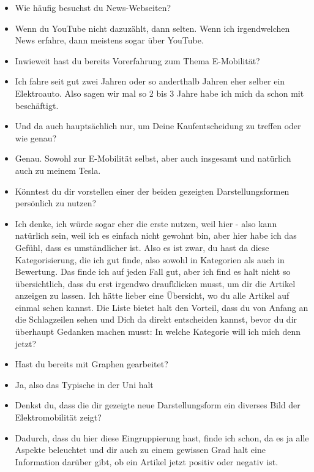{\begin{itemize}[]
                  Und dann halt typische Internetforen.
            \item {} Wie häufig besuchst du News-Webseiten?
            \item {} Wenn du YouTube nicht dazuzählt, dann selten.
                  Wenn ich irgendwelchen News erfahre, dann meistens sogar über YouTube.
            \item {} Inwieweit hast du bereits Vorerfahrung zum Thema E-Mobilität?
            \item {} Ich fahre seit gut zwei Jahren oder so anderthalb Jahren eher selber ein Elektroauto.
                  Also sagen wir mal so 2 bis 3 Jahre habe ich mich da schon mit beschäftigt.
            \item {} Und da auch hauptsächlich nur, um Deine Kaufentscheidung zu treffen oder wie genau?
            \item {} Genau.
                  Sowohl zur E-Mobilität selbst, aber auch insgesamt und natürlich auch zu meinem Tesla.
            \item {} Könntest du dir vorstellen einer der beiden gezeigten Darstellungsformen persönlich zu nutzen?
            \item {} Ich denke, ich würde sogar eher die erste nutzen, weil hier - also kann natürlich sein, weil ich es einfach nicht gewohnt bin, aber hier habe ich das Gefühl, dass es umständlicher ist.
                  Also es ist zwar, du hast da diese Kategorisierung, die ich gut finde, also sowohl in Kategorien als auch in Bewertung.
                  Das finde ich auf jeden Fall gut, aber ich find es halt nicht so übersichtlich, dass du erst irgendwo draufklicken musst, um dir die Artikel anzeigen zu lassen.
                  Ich hätte lieber eine Übersicht, wo du alle Artikel auf einmal sehen kannst.
                  Die Liste bietet halt den Vorteil, dass du von Anfang an die Schlagzeilen sehen und Dich da direkt entscheiden kannst, bevor du dir überhaupt Gedanken machen musst: In welche Kategorie will ich mich denn jetzt?
            \item {} Hast du bereits mit Graphen gearbeitet?
            \item {} Ja, also das Typische in der Uni halt
            \item {} Denkst du, dass die dir gezeigte neue Darstellungsform ein diverses Bild der Elektromobilität zeigt?
            \item {} Dadurch, dass du hier diese Eingruppierung hast, finde ich schon, da es ja alle Aspekte beleuchtet und dir auch zu einem gewissen Grad halt eine Information darüber gibt, ob ein Artikel jetzt positiv oder negativ ist.

\end{itemize}}
